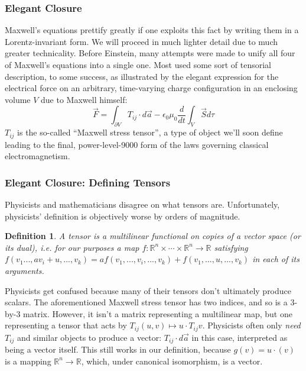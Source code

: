 \documentclass[10pt]{beamer}
\newtheorem{mydef}{Definition}
\begin{document}
\begin{frame}
  \frametitle{Elegant Closure}
  Maxwell's equations prettify greatly if one exploits this fact by writing them in a Lorentz-invariant form.
  We will proceed in much lighter detail due to much greater technicality.
  Before Einstein, many attempts were made to unify all four of Maxwell's equations into a single one.
  Most used some sort of tensorial description, to some success, as illustrated by the elegant expression for the electrical force on an arbitrary, time-varying charge configuration in an enclosing volume $V$ due to Maxwell himself:
  \[
    \vec{F}=\int_{\partial V}T_{ij}\cdot d\vec{a}-\epsilon_{0}\mu_{0}\frac{d}{dt}\int_{V}\vec{S}d\tau
  \]
  $T_{ij}$ is the so-called ``Maxwell stress tensor'', a type of object we'll soon define leading to the final, power-level-9000 form of the laws governing classical electromagnetism.
\end{frame}

\begin{frame}
  \frametitle{Elegant Closure: Defining Tensors}
  Physicists and mathematicians disagree on what tensors are.
  Unfortunately, physicists' definition is objectively worse by orders of magnitude.
  \begin{mydef}
    \textit{A tensor is a multilinear functional on copies of a vector space (or its dual), i.e. for our purposes a map} $f:\mathbb{R}^n\times\cdots\times \mathbb{R}^n\to \mathbb{R}$ \textit{satisfying}
    $f(v_{1}...,av_{i}+u,...,v_{k})=af(v_{1},...,v_{i},...,v_{k})+f(v_{1},...,u,...,v_{k})$ \textit{in each of its arguments.}
  \end{mydef}
  Physicists get confused because many of their tensors don't ultimately produce scalars.
  The aforementioned Maxwell stress tensor has two indices, and so is a 3-by-3 matrix.
  However, it isn't a matrix representing a multilinear map, but one representing a tensor that acts by $T_{ij}(u,v)\mapsto u\cdot T_{ij}v$.
  Physicists often only \textit{need} $T_{ij}$ and similar objects to produce a vector: $T_{ij}\cdot d\vec{a}$ in this case, interpreted as being a vector itself.
  This still works in our definition, because $g(v)=u\cdot (v)$ is a mapping $\mathbb{R}^{n}\to \mathbb{R}$, which, under canonical isomorphism, is a vector.
\end{frame}
\end{document}
